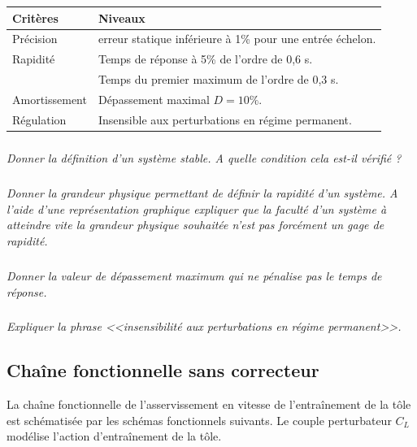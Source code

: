 \documentclass[10pt,fleqn]{article} %
\begin{document}
\begin{multicols}{2}
\begin{center}
\begin{tabular}{|p{.25\linewidth}|p{.65\linewidth}|}
\hline
Critères & Niveaux \\
\hline
\hline
Précision & erreur statique inférieure à 1\% pour une entrée échelon. \\
\hline
Rapidité & Temps de réponse à 5\% de l'ordre de 0,6 s. \\
& Temps du premier maximum de l'ordre de 0,3 s. \\
\hline
Amortissement & Dépassement maximal $D=10\%$. \\
\hline
Régulation & Insensible aux perturbations en régime permanent. \\
\hline
\end{tabular}
\end{center}

\subparagraph{}
\textit{Donner la définition d'un système stable. A quelle condition cela est-il vérifié ?}

\ifprof
\begin{corrige}
\end{corrige}
\else
\fi
\subparagraph{}
\textit{Donner la grandeur physique permettant de définir la rapidité d'un système. A l'aide d'une représentation graphique expliquer que la faculté d’un système à atteindre vite la grandeur physique souhaitée n’est pas forcément un gage de rapidité.}

\ifprof
\begin{corrige}
\end{corrige}
\else \fi

\subparagraph{}
\textit{Donner la valeur de dépassement maximum qui ne pénalise pas le temps de réponse.}

\ifprof
\begin{corrige}
\end{corrige}
\else \fi

\subparagraph{}
\textit{Expliquer la phrase <<insensibilité aux perturbations en régime permanent>>.}

\ifprof
\begin{corrige}
\end{corrige}
\else \fi

\subsection*{Chaîne fonctionnelle sans correcteur}

La chaîne fonctionnelle de l'asservissement en vitesse de l'entraînement de la tôle est schématisée par les schémas fonctionnels suivants. Le couple perturbateur $C_L$ modélise l'action d'entraînement de la tôle.


\end{multicols}
\end{document}
